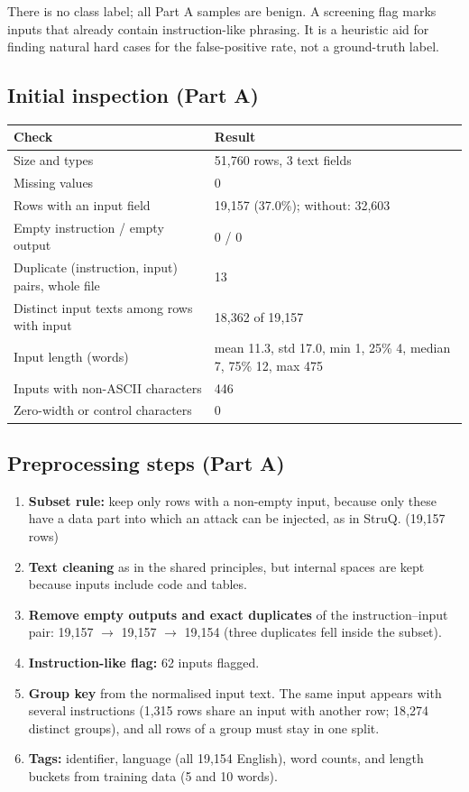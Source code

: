 \documentclass[11pt,a4paper]{article}
\newcommand{\hdr}[1]{\textbf{#1}}
\begin{document}
\smallskip
There is no class label; all Part A samples are benign. A screening flag marks inputs that already contain instruction-like phrasing. It is a heuristic aid for finding natural hard cases for the false-positive rate, not a ground-truth label.

\subsection{Initial inspection (Part A)}
\begin{tabularx}{\textwidth}{@{}L{5.2cm}X@{}}
\toprule
{}\hdr{Check} & \hdr{Result}\\
\midrule
Size and types & 51{,}760 rows, 3 text fields\\
Missing values & 0\\
Rows with an input field & 19{,}157 (37.0\%); without: 32{,}603\\
Empty instruction / empty output & 0 / 0\\
Duplicate (instruction, input) pairs, whole file & 13\\
Distinct input texts among rows with input & 18{,}362 of 19{,}157\\
Input length (words) & mean 11.3, std 17.0, min 1, 25\% 4, median 7, 75\% 12, max 475\\
Inputs with non-ASCII characters & 446\\
Zero-width or control characters & 0\\
\bottomrule
\end{tabularx}

\subsection{Preprocessing steps (Part A)}
\begin{enumerate}
\item \textbf{Subset rule:} keep only rows with a non-empty input, because only these have a data part into which an attack can be injected, as in StruQ. (19{,}157 rows)
\item \textbf{Text cleaning} as in the shared principles, but internal spaces are kept because inputs include code and tables.
\item \textbf{Remove empty outputs and exact duplicates} of the instruction--input pair: 19{,}157 $\to$ 19{,}157 $\to$ 19{,}154 (three duplicates fell inside the subset).
\item \textbf{Instruction-like flag:} 62 inputs flagged.
\item \textbf{Group key} from the normalised input text. The same input appears with several instructions (1{,}315 rows share an input with another row; 18{,}274 distinct groups), and all rows of a group must stay in one split.
\item \textbf{Tags:} identifier, language (all 19{,}154 English), word counts, and length buckets from training data (5 and 10 words).
\end{enumerate}
\end{document}
